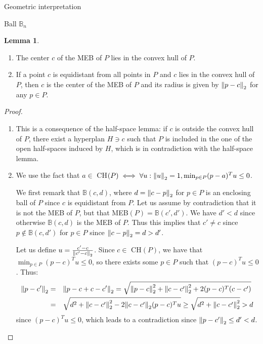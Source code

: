 \documentclass{article}
\theoremstyle{definition}
\newtheorem{lem}[theo]{Lemma}
\theoremstyle{remark}
\begin{document}
\begin{subsection}{Geometric interpretation}
\begin{subsubsection}{Ball $\mathbb{B}_n$}
  \begin{lem}
    \label{lemball}
    \begin{enumerate}
      \item The center $c$ of the MEB of $P$ lies in the convex hull of $P$.
      \item If a point $c$ is equidistant from all points in $P$ and $c$ lies in the convex hull of $P$, then $c$ is the center of the MEB of $P$ and its radius is given by $\norm{p-c}_2$ for any $p \in P$.
    \end{enumerate}
  \end{lem}

  \begin{proof}
    \begin{enumerate}
      \item This is a consequence of the half-space lemma: if $c$ is outside the convex hull of $P$, there exist a hyperplan $H \ni c$ such that $P$ is included in the one of the open half-spaces induced by $H$, which is in contradiction with the half-space lemma.
      \item We use the fact that $a \in$ CH$(P) \iff \forall u : \norm{u}_2 = 1, \min_{p \in P} (p-a)^Tu \leq 0$.

        We first remark that $\mathbb{B}(c,d)$, where $d = \norm{c-p}_2$ for $p \in P$ is an enclosing ball of $P$ since $c$ is equidistant from $P$. Let us assume by contradiction that it is not the MEB of $P$, but that MEB$(P) = \mathbb{B}(c',d')$. We have $d' < d$ since otherwise $\mathbb{B}(c,d)$ is the MEB of $P$. Thus this implies that $c'\not=c$ since $p \not\in \mathbb{B}(c,d')$ for $p \in P$ since  $\norm{c-p}_2 = d > d'$.

        Let us define $u = \frac{c'-c}{\norm{c'-c}_2}$. Since $c \in$ CH$(P)$, we have that $\min_{p \in P} (p-c)^Tu \leq 0$, so there exists some $p \in P$ such that $(p-c)^Tu \leq 0$. Thus:
        \begin{equation}
          \begin{aligned}
            \norm{p-c'}_2 &=&& \norm{p-c+c-c'}_2 = \sqrt{\norm{p-c}_2^2 +\norm{c-c'}_2^2 + 2(p-c)^T(c-c')}\\
            &=&& \sqrt{d^2 +\norm{c-c'}_2^2 - 2\norm{c-c'}_2(p-c)^Tu} \geq \sqrt{d^2 +\norm{c-c'}_2^2} > d
          \end{aligned}
        \end{equation}
        since $(p-c)^Tu \leq 0$, which leads to a contradiction since $\norm{p-c'}_2 \leq d' < d$.
    \end{enumerate}
  \end{proof}


\end{subsubsection}
\end{subsection}
\end{document}
